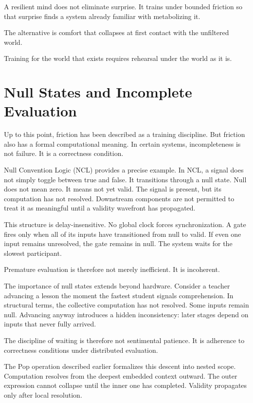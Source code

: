 \documentclass[12pt]{article}
\begin{document}
A resilient mind does not eliminate surprise. It trains under bounded friction so that surprise finds a system already familiar with metabolizing it.

The alternative is comfort that collapses at first contact with the unfiltered world.

Training for the world that exists requires rehearsal under the world as it is.

\section{Null States and Incomplete Evaluation}

Up to this point, friction has been described as a training discipline. But friction also has a formal computational meaning. In certain systems, incompleteness is not failure. It is a correctness condition.

Null Convention Logic (NCL) provides a precise example. In NCL, a signal does not simply toggle between true and false. It transitions through a null state. Null does not mean zero. It means not yet valid. The signal is present, but its computation has not resolved. Downstream components are not permitted to treat it as meaningful until a validity wavefront has propagated.

This structure is delay-insensitive. No global clock forces synchronization. A gate fires only when all of its inputs have transitioned from null to valid. If even one input remains unresolved, the gate remains in null. The system waits for the slowest participant.

Premature evaluation is therefore not merely inefficient. It is incoherent.

The importance of null states extends beyond hardware. Consider a teacher advancing a lesson the moment the fastest student signals comprehension. In structural terms, the collective computation has not resolved. Some inputs remain null. Advancing anyway introduces a hidden inconsistency: later stages depend on inputs that never fully arrived.

The discipline of waiting is therefore not sentimental patience. It is adherence to correctness conditions under distributed evaluation.

The Pop operation described earlier formalizes this descent into nested scope. Computation resolves from the deepest embedded context outward. The outer expression cannot collapse until the inner one has completed. Validity propagates only after local resolution.
\end{document}
